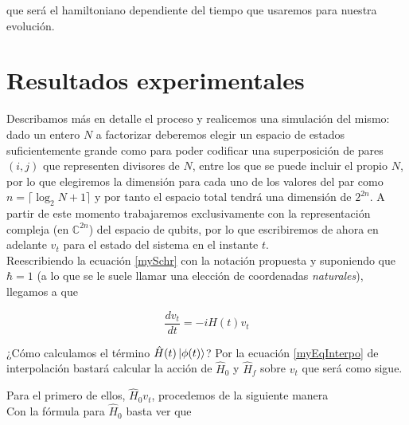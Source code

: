 \documentclass[11pt, spanish]{report}
\numberwithin{equation}{section}
\numberwithin{defin}{section}
\begin{document}
que será el hamiltoniano dependiente del tiempo que usaremos para nuestra evolución.

\section{Resultados experimentales}

Describamos más en detalle el proceso y realicemos una simulación del mismo: dado un entero $N$ a factorizar deberemos elegir un espacio de estados suficientemente grande como para poder codificar una superposición de pares $(i,j)$ que representen divisores de $N$, entre los que se puede incluir el propio $N$, por lo que elegiremos la dimensión para cada uno de los valores del par como $n=\lceil \log_2 N + 1 \rceil$ y por tanto el espacio total tendrá una dimensión de $2^{2n}$. A partir de este momento trabajaremos exclusivamente con la representación compleja (en $\mathbb{C}^{2n}$) del espacio de qubits, por lo que escribiremos de ahora en adelante $v_t$ para el estado del sistema en el instante $t$.\\

Reescribiendo la ecuación \ref{mySchr} con la notación propuesta y suponiendo que $\hbar=1$ (a lo que se le suele llamar una elección de coordenadas \emph{naturales}), llegamos a que

\begin{equation}
\frac{d v_t}{d t}=-iH(t)v_t
\end{equation}

¿Cómo calculamos el término $\hat{H}(t)\ket{\phi(t)}$? Por la ecuación \ref{myEqInterpo} de interpolación bastará calcular la acción de $\hat{H}_0$ y $\hat{H}_f$ sobre $v_t$ que será como sigue\footnotemark{}.\\


Para el primero de ellos, $\hat{H}_0v_t$, procedemos de la siguiente manera\\

Con la fórmula para $\hat{H}_0$ basta ver que 
\end{document}
